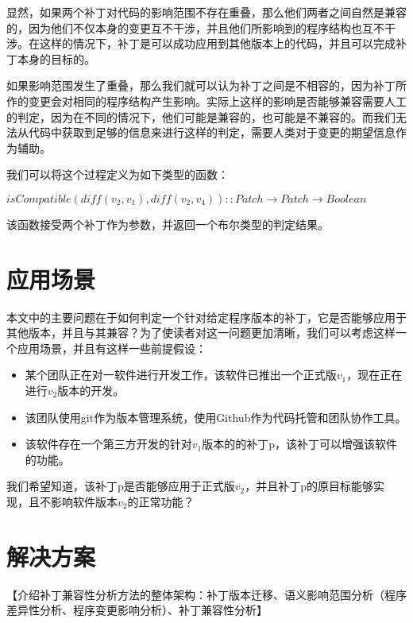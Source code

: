 显然，如果两个补丁对代码的影响范围不存在重叠，那么他们两者之间自然是兼容的，因为他们不仅本身的变更互不干涉，并且他们所影响到的程序结构也互不干涉。在这样的情况下，补丁是可以成功应用到其他版本上的代码，并且可以完成补丁本身的目标的。

如果影响范围发生了重叠，那么我们就可以认为补丁之间是不相容的，因为补丁所作的变更会对相同的程序结构产生影响。实际上这样的影响是否能够兼容需要人工的判定，因为在不同的情况下，他们可能是兼容的，也可能是不兼容的。而我们无法从代码中获取到足够的信息来进行这样的判定，需要人类对于变更的期望信息作为辅助。

我们可以将这个过程定义为如下类型的函数：

\begin{definition}
	$isCompatible(diff(v_2,v_1),diff(v_2,v_4)) :: Patch \rightarrow Patch \rightarrow Boolean$
\end{definition}

该函数接受两个补丁作为参数，并返回一个布尔类型的判定结果。

\section{应用场景}

本文中的主要问题在于如何判定一个针对给定程序版本的补丁，它是否能够应用于其他版本，并且与其兼容？为了使读者对这一问题更加清晰，我们可以考虑这样一个应用场景，并且有这样一些前提假设：

\begin{itemize}
	\item 某个团队正在对一软件进行开发工作，该软件已推出一个正式版$v_{1}$，现在正在进行$v_{2}$版本的开发。
	
	\item 该团队使用git作为版本管理系统，使用Github作为代码托管和团队协作工具。
	
	\item 该软件存在一个第三方开发的针对$v_{1}$版本的的补丁p，该补丁可以增强该软件的功能。
	
\end{itemize}

我们希望知道，该补丁p是否能够应用于正式版$v_{2}$，并且补丁p的原目标能够实现，且不影响软件版本$v_{2}$的正常功能？


\section{解决方案}
【介绍补丁兼容性分析方法的整体架构：补丁版本迁移、语义影响范围分析（程序差异性分析、程序变更影响分析）、补丁兼容性分析】

